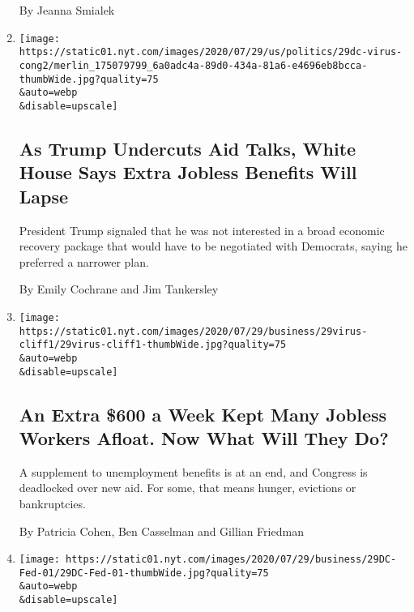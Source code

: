 \begin{enumerate}
  By Jeanna Smialek
\item
  \href{/2020/07/29/business/economy/virus-aid-trump.html}{}

  \texttt{[image: https://static01.nyt.com/images/2020/07/29/us/politics/29dc-virus-cong2/merlin\_175079799\_6a0adc4a-89d0-434a-81a6-e4696eb8bcca-thumbWide.jpg?quality=75\\\&auto=webp\\\&disable=upscale]}

  \hypertarget{as-trump-undercuts-aid-talks-white-house-says-extra-jobless-benefits-will-lapse}{%
  \subsection{As Trump Undercuts Aid Talks, White House Says Extra
  Jobless Benefits Will
  Lapse}\label{as-trump-undercuts-aid-talks-white-house-says-extra-jobless-benefits-will-lapse}}

  President Trump signaled that he was not interested in a broad
  economic recovery package that would have to be negotiated with
  Democrats, saying he preferred a narrower plan.

  By Emily Cochrane and Jim Tankersley
\item
  \href{/2020/07/29/business/economy/unemployment-benefits-coronavirus.html}{}

  \texttt{[image: https://static01.nyt.com/images/2020/07/29/business/29virus-cliff1/29virus-cliff1-thumbWide.jpg?quality=75\\\&auto=webp\\\&disable=upscale]}

  \hypertarget{an-extra-600-a-week-kept-many-jobless-workers-afloat-now-what-will-they-do}{%
  \subsection{An Extra \$600 a Week Kept Many Jobless Workers Afloat.
  Now What Will They
  Do?}\label{an-extra-600-a-week-kept-many-jobless-workers-afloat-now-what-will-they-do}}

  A supplement to unemployment benefits is at an end, and Congress is
  deadlocked over new aid. For some, that means hunger, evictions or
  bankruptcies.

  By Patricia Cohen, Ben Casselman and Gillian Friedman
\item
  \href{/2020/07/29/business/economy/federal-reserve-meeting-interest-rates.html}{}

  \texttt{[image: https://static01.nyt.com/images/2020/07/29/business/29DC-Fed-01/29DC-Fed-01-thumbWide.jpg?quality=75\\\&auto=webp\\\&disable=upscale]}


\end{enumerate}
